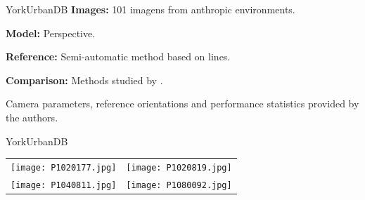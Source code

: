 \begin{frame}{YorkUrbanDB}{}
  {\bf Images:} 101 imagens from anthropic environments.

  {\bf Model:} Perspective.

  {\bf Reference:} Semi-automatic method based on lines.

  {\bf Comparison:} Methods studied by \cite{Denis2008}.

  Camera parameters, reference orientations and performance statistics provided by the authors.

\end{frame}

\begin{frame}{YorkUrbanDB}
\begin{center}
\begin{tabular}{cc}
  \texttt{[image: P1020177.jpg]}&
  \texttt{[image: P1020819.jpg]}\\
  \texttt{[image: P1040811.jpg]}&
  \texttt{[image: P1080092.jpg]}
\end{tabular}
\end{center}
\end{frame}


